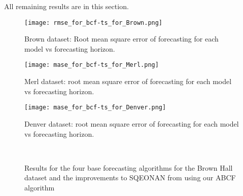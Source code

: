 \label{app:results}
All remaining results are in this section. 

\begin{figure}[!ht]
	\begin{center}
		\texttt{[image: rmse\_for\_bcf-ts\_for\_Brown.png]}
	\end{center}
	\caption{Brown dataset: Root mean square error of forecasting for each model vs forecasting horizon.}
	\label{fig:rmseplotbrown}
\end{figure}


\begin{figure}[!ht]
	\begin{center}
		\texttt{[image: mase\_for\_bcf-ts\_for\_Merl.png]}
	\end{center}
	\caption{Merl dataset: root mean square error of forecasting for each model vs forecasting horizon.}
	\label{fig:maseplotmerl}
\end{figure}

\begin{figure}[!ht]
	\begin{center}
		\texttt{[image: mase\_for\_bcf-ts\_for\_Denver.png]}
	\end{center}
	\caption{Denver dataset: root mean square error of forecasting for each model vs forecasting horizon.}
	\label{fig:maseplotdenver}
\end{figure}




\begin{figure}[!h]
	\begin{center}
		 \\
	\end{center}
	\caption{Results for the four base forecasting algorithms for the Brown Hall dataset and the improvements to SQEONAN from using our ABCF algorithm}
	\label{fig:sqe_merl_results}
\end{figure}

